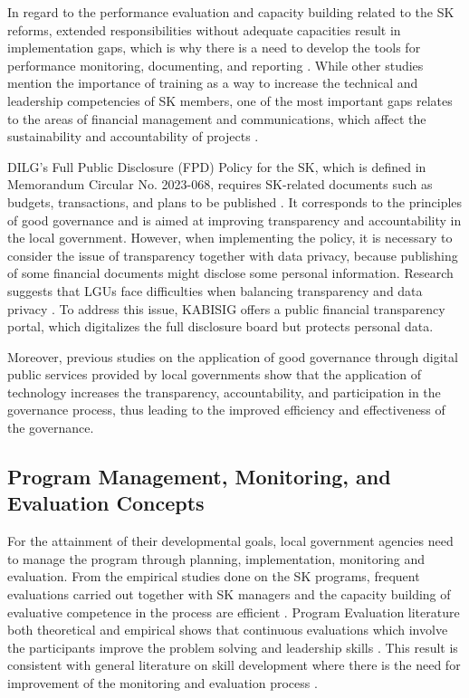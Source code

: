 \hspace*{\parindent}In regard to the performance evaluation and capacity building related to the SK reforms, extended responsibilities without adequate capacities result in implementation gaps, which is why there is a need to develop the tools for performance monitoring, documenting, and reporting \cite{K}. While other studies mention the importance of training as a way to increase the technical and leadership competencies of SK members, one of the most important gaps relates to the areas of financial management and communications, which affect the sustainability and accountability of projects \cite{B,K}.
\vspace{5mm}

\hspace*{\parindent}DILG's Full Public Disclosure (FPD) Policy for the SK, which is defined in Memorandum Circular No. 2023-068, requires SK-related documents such as budgets, transactions, and plans to be published \cite{M}. It corresponds to the principles of good governance \cite{O} and is aimed at improving transparency and accountability in the local government. However, when implementing the policy, it is necessary to consider the issue of transparency together with data privacy, because publishing of some financial documents might disclose some personal information. Research suggests that LGUs face difficulties when balancing transparency and data privacy \cite{AJ,AW}. To address this issue, KABISIG offers a public financial transparency portal, which digitalizes the full disclosure board but protects personal data.
\vspace{5mm}

\hspace*{\parindent}Moreover, previous studies on the application of good governance through digital public services provided by local governments show that the application of technology increases the transparency, accountability, and participation in the governance process, thus leading to the improved efficiency and effectiveness of the governance.
\vspace{5mm}

\subsection{Program Management, Monitoring, and Evaluation Concepts}

\hspace*{\parindent}For the attainment of their developmental goals, local government agencies need to manage the program through planning, implementation, monitoring and evaluation. From the empirical studies done on the SK programs, frequent evaluations carried out together with SK managers and the capacity building of evaluative competence in the process are efficient \cite{AP}. Program Evaluation literature both theoretical and empirical shows that continuous evaluations which involve the participants improve the problem solving and leadership skills \cite{I}. This result is consistent with general literature on skill development where there is the need for improvement of the monitoring and evaluation process \cite{I,K,S,AB,AP}.
\vspace{5mm}

